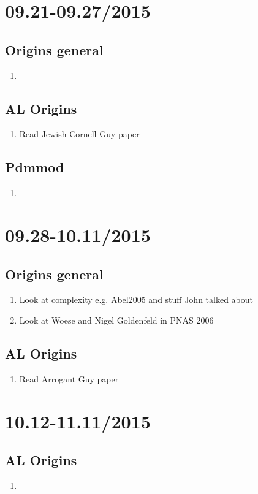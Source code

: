 \documentclass[12pt]{paper}
\begin{document}
\section{09.21-09.27/2015}
\subsection*{Origins general}
\begin{enumerate}
\item 
\end{enumerate}

\subsection*{AL Origins}
\begin{enumerate}
\item Read Jewish Cornell Guy paper
\end{enumerate}

\subsection*{Pdmmod}
\begin{enumerate}
 \item 
\end{enumerate}

\section{09.28-10.11/2015}
\subsection*{Origins general}
\begin{enumerate}
 \item   Look at complexity e.g. Abel2005 and stuff John talked about
\item  Look at  Woese and Nigel Goldenfeld in PNAS 2006
\end{enumerate}

\subsection*{AL Origins}
\begin{enumerate}
 \item   Read Arrogant Guy paper
\end{enumerate}

\section{10.12-11.11/2015}
\subsection*{AL Origins}
\begin{enumerate}
 \item   
\end{enumerate}
\end{document}
